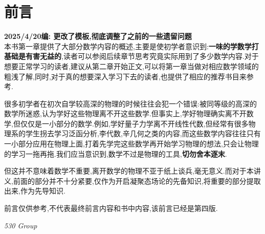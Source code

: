 \chapter*{前言}



\textbf{2025/4/20编: 更改了模板,彻底调整了之前的一些遗留问题}\\

本书第一章提供了大部分数学内容的概述,主要是使初学者意识到:\textbf{一味的学数学打基础是有害无益的},读者可以参阅后续章节思考究竟实际用到了多少数学内容.对于想要正常学习的读者,建议从第二章开始正文,可以将第一章当做对相应数学领域的粗浅了解,同时,对于真的想要深入学习下去的读者,也提供了相应的推荐书目来参考.

很多初学者在初次自学较高深的物理的时候往往会犯一个错误:被同等级的高深的数学所迷惑,认为学好这些物理离不开这些数学.但事实上,学好物理确实离不开数学,但仅仅是一小部分的数学.例如,学好量子力学离不开线性代数,但经常有很多物理系的学生拐去学习泛函分析,李代数,辛几何之类的内容,而这些数学内容往往只有一小部分应用在物理上面,打着先学完这些数学再开始学习物理的想法,只会让物理的学习一拖再拖.我们应当意识到,数学不过是物理的工具,\textbf{切勿舍本逐末}.

但这并不意味着数学不重要,离开数学的物理不亚于纸上谈兵,毫无意义.而对于本讲义,前面的部分并不十分紧要,仅作为开启凝聚态场论的先备知识,将重要的部分提取出来,作为先导知识.%

前言仅供参考,不代表最终前言内容和书中内容,该前言已经是第四版.




\begin{flushright}
	\textit{530 Group}
\end{flushright}
